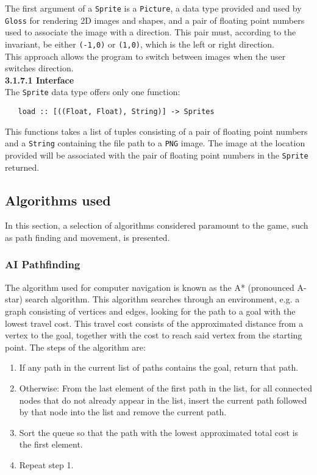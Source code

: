 \documentclass{article}
\begin{document}
    	\noindent The first argument of a \texttt{Sprite} is a \texttt{Picture}, a data type provided and used by \texttt{Gloss} for rendering 2D images and shapes, and a pair of floating point numbers used to associate the image with a direction. This pair must, according to the invariant, be either \texttt{(-1,0)} or \texttt{(1,0)}, which is the left or right direction. \\
        \newline
        This approach allows the program to switch between images when the user switches direction. \\
        \newline
        \textbf{3.1.7.1 Interface} \\
        \newline
        The \texttt{Sprite} data type offers only one function:
   \begin{verbatim}
   load :: [((Float, Float), String)] -> Sprites
   \end{verbatim}
        This functions takes a list of tuples consisting of a pair of floating point numbers and a \texttt{String} containing the file path to a \texttt{PNG} image. The image at the location provided will be associated with the pair of floating point numbers in the \texttt{Sprite} returned.
    \subsection{Algorithms used}
    In this section, a selection of algorithms considered paramount to the game, such as path finding and movement, is presented.
		\subsubsection{AI Pathfinding}
        The algorithm used for computer navigation is known as the A* (pronounced A-star) search algorithm. This algorithm searches through an environment, e.g. a graph consisting of vertices and edges, looking for the path to a goal with the lowest travel cost.
        This travel cost consists of the approximated distance from a vertex to the goal, together with the cost to reach said vertex from the starting point. The steps of the algorithm are:
\begin{enumerate}
\item If any path in the current list of paths contains the goal, return that path.
\item Otherwise: From the last element of the first path in the list, for all connected nodes that do not already appear in the list, insert the current path followed by that node into the list and remove the current path.
\item Sort the queue so that the path with the lowest approximated total cost is the first element.
\item Repeat step 1.
\end{enumerate}
\end{document}
